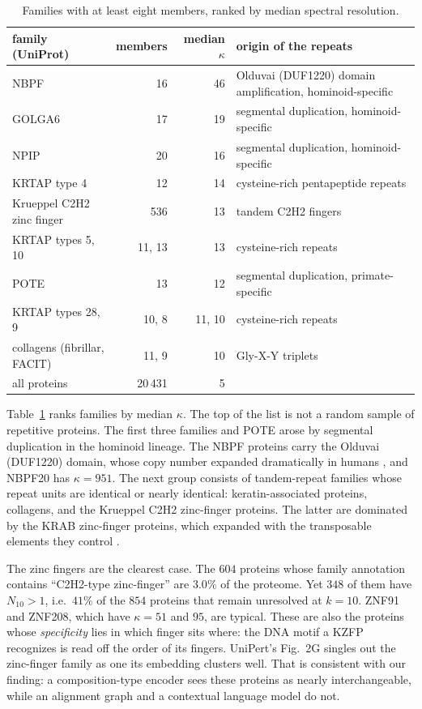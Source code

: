 \documentclass[11pt]{article}
\theoremstyle{plain}
\theoremstyle{definition}
\theoremstyle{remark}
\begin{document}
\begin{table}[t]
\centering\small
\begin{tabular}{>{\raggedright\arraybackslash}p{}rr>{\raggedright\arraybackslash}p{}}
\toprule
family (UniProt) & members & median $\kappa$ & origin of the repeats\\
\midrule
NBPF & 16 & 46 & Olduvai (DUF1220) domain amplification, hominoid-specific\\
GOLGA6 & 17 & 19 & segmental duplication, hominoid-specific\\
NPIP & 20 & 16 & segmental duplication, hominoid-specific\\
KRTAP type 4 & 12 & 14 & cysteine-rich pentapeptide repeats\\
Krueppel C2H2 zinc finger & 536 & 13 & tandem C2H2 fingers\\
KRTAP types 5, 10 & 11, 13 & 13 & cysteine-rich repeats\\
POTE & 13 & 12 & segmental duplication, primate-specific\\
KRTAP types 28, 9 & 10, 8 & 11, 10 & cysteine-rich repeats\\
collagens (fibrillar, FACIT) & 11, 9 & 10 & Gly-X-Y triplets\\
\midrule
all proteins & 20\,431 & 5 & \\
\bottomrule
\end{tabular}
\caption{Families with at least eight members, ranked by median spectral resolution.}\label{tab:fam}
\end{table}

Table~\ref{tab:fam} ranks families by median $\kappa$. The top of the list is not a random sample of
repetitive proteins. The first three families and POTE arose by segmental duplication in the hominoid
lineage. The NBPF proteins carry the Olduvai (DUF1220) domain, whose copy number expanded
dramatically in humans \cite{OBl12}, and NBPF20 has $\kappa=951$. The next group consists of tandem-repeat
families whose repeat units are identical or nearly identical: keratin-associated proteins,
collagens, and the Krueppel C2H2 zinc-finger proteins. The latter are dominated by the KRAB
zinc-finger proteins, which expanded with the transposable elements they control \cite{Imb17}.

The zinc fingers are the clearest case. The $604$ proteins whose family annotation contains
``C2H2-type zinc-finger'' are $3.0\%$ of the proteome. Yet $348$ of them have $N_{10}>1$, i.e.\
$41\%$ of the $854$ proteins that remain unresolved at $k=10$. ZNF91 and ZNF208, which have
$\kappa=51$ and $95$, are typical. These are also the proteins whose \emph{specificity} lies in which
finger sits where: the DNA motif a KZFP recognizes is read off the order of its fingers.
UniPert's Fig.~2G singles out the zinc-finger family as one its embedding clusters well. That is
consistent with our finding: a composition-type encoder sees these proteins as nearly
interchangeable, while an alignment graph and a contextual language model do not.
\end{document}

